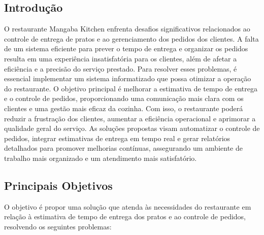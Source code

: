 \hspace{4.5mm}
\subsection{Introdução}
O restaurante Mangaba Kitchen enfrenta desafios significativos relacionados ao controle de entrega de pratos e ao gerenciamento dos pedidos dos clientes. A falta de um sistema eficiente para prever o tempo de entrega e organizar os pedidos resulta em uma experiência insatisfatória para os clientes, além de afetar a eficiência e a precisão do serviço prestado. Para resolver esses problemas, é essencial implementar um sistema informatizado que possa otimizar a operação do restaurante. O objetivo principal é melhorar a estimativa de tempo de entrega e o controle de pedidos, proporcionando uma comunicação mais clara com os clientes e uma gestão mais eficaz da cozinha. Com isso, o restaurante poderá reduzir a frustração dos clientes, aumentar a eficiência operacional e aprimorar a qualidade geral do serviço. As soluções propostas visam automatizar o controle de pedidos, integrar estimativas de entrega em tempo real e gerar relatórios detalhados para promover melhorias contínuas, assegurando um ambiente de trabalho mais organizado e um atendimento mais satisfatório.

\subsection{Principais Objetivos}
O objetivo é propor uma solução que atenda às necessidades do restaurante em relação à estimativa de tempo de entrega dos pratos e ao controle de pedidos, resolvendo os seguintes problemas:

